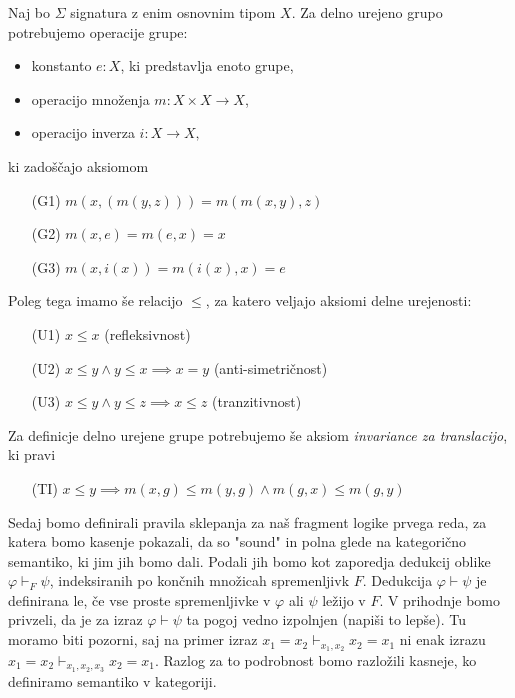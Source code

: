 \documentclass[../kategoricna_logika.tex]{subfiles}
\begin{document}
\begin{primer}
  Naj bo $\Sigma$ signatura z enim osnovnim tipom $X$. Za delno urejeno grupo potrebujemo operacije grupe:
  \begin{itemize}
    \item konstanto $e : X$, ki predstavlja enoto grupe,
    \item operacijo množenja $m : X \times X \to X$,
    \item operacijo inverza $i : X \to X,$
  \end{itemize}
  ki zadoščajo aksiomom
  \begin{itemize}
    \item[(G1)] $m(x,(m(y,z))) = m(m(x,y), z)$
    \item[(G2)] $m(x,e) = m(e,x) = x$
    \item[(G3)] $m(x,i(x)) = m(i(x), x) = e$
  \end{itemize}
  Poleg tega imamo še relacijo $\leq$, za katero veljajo aksiomi delne urejenosti:
  \begin{itemize}
    \item[(U1)] $x \leq x$ (refleksivnost)
    \item[(U2)] $x \leq y \wedge y \leq x \implies x = y$ (anti-simetričnost)
    \item[(U3)] $x \leq y \wedge y \leq z \implies x \leq z$ (tranzitivnost)
  \end{itemize}
  Za definicje delno urejene grupe potrebujemo še aksiom \emph{invariance za translacijo}, ki pravi
  \begin{itemize}
    \item[(TI)] $x \leq y \implies m(x, g) \leq m(y, g) \wedge m(g,x) \leq m(g,y)$
  \end{itemize}
\end{primer}

Sedaj bomo definirali pravila sklepanja za naš fragment logike prvega reda, za katera bomo kasenje pokazali, da so "sound" in polna glede na kategorično semantiko, ki jim jih bomo dali.
Podali jih bomo kot zaporedja dedukcij oblike $\varphi \vdash_F \psi$, indeksiranih po končnih množicah spremenljivk $F$. Dedukcija $\varphi \vdash \psi$ je definirana le, če vse proste spremenljivke v $\varphi$ ali $\psi$ ležijo v $F$. V prihodnje bomo privzeli, da je za izraz $\varphi \vdash \psi$ ta pogoj vedno izpolnjen (napiši to lepše).
Tu moramo biti pozorni, saj na primer izraz $x_1 = x_2 \vdash_{x_1, x_2} x_2 = x_1$ ni enak izrazu $x_1 = x_2 \vdash_{x_1, x_2, x_3} x_2 = x_1$. Razlog za to podrobnost bomo razložili kasneje, ko definiramo semantiko v kategoriji.
\end{document}
